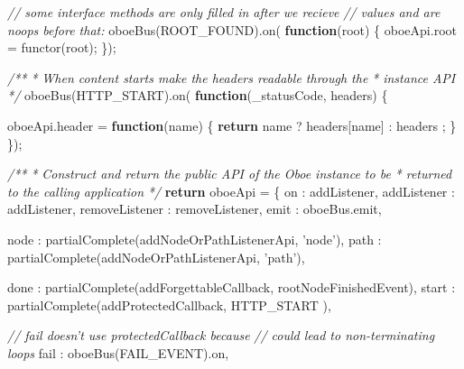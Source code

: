 \documentclass[12pt, ]{article}
\newenvironment{Shaded}{}{}
\newcommand{\KeywordTok}[1]{\textcolor[rgb]{0.00,0.44,0.13}{\textbf{{#1}}}}
\newcommand{\DataTypeTok}[1]{\textcolor[rgb]{0.56,0.13,0.00}{{#1}}}
\newcommand{\StringTok}[1]{\textcolor[rgb]{0.25,0.44,0.63}{{#1}}}
\newcommand{\CommentTok}[1]{\textcolor[rgb]{0.38,0.63,0.69}{\textit{{#1}}}}
\newcommand{\OtherTok}[1]{\textcolor[rgb]{0.00,0.44,0.13}{{#1}}}
\newcommand{\FunctionTok}[1]{\textcolor[rgb]{0.02,0.16,0.49}{{#1}}}
\newcommand{\NormalTok}[1]{{#1}}
\begin{document}
\begin{Shaded}
\begin{Highlighting}[]
   
   \CommentTok{// some interface methods are only filled in after we recieve}
   \CommentTok{// values and are noops before that:          }
   \FunctionTok{oboeBus}\NormalTok{(ROOT_FOUND).}\FunctionTok{on}\NormalTok{( }\KeywordTok{function}\NormalTok{(root) \{}
      \OtherTok{oboeApi}\NormalTok{.}\FunctionTok{root} \NormalTok{= }\FunctionTok{functor}\NormalTok{(root);   }
   \NormalTok{\});}

   \CommentTok{/**}
\CommentTok{    * When content starts make the headers readable through the}
\CommentTok{    * instance API}
\CommentTok{    */}
   \FunctionTok{oboeBus}\NormalTok{(HTTP_START).}\FunctionTok{on}\NormalTok{( }\KeywordTok{function}\NormalTok{(_statusCode, headers) \{}
   
      \OtherTok{oboeApi}\NormalTok{.}\FunctionTok{header} \NormalTok{=  }\KeywordTok{function}\NormalTok{(name) \{}
                           \KeywordTok{return} \NormalTok{name ? headers[name] }
                                       \NormalTok{: headers}
                                       \NormalTok{;}
                        \NormalTok{\}}
   \NormalTok{\});}
                                                               
   \CommentTok{/**}
\CommentTok{    * Construct and return the public API of the Oboe instance to be }
\CommentTok{    * returned to the calling application}
\CommentTok{    */}       
   \KeywordTok{return} \NormalTok{oboeApi = \{}
      \DataTypeTok{on             }\NormalTok{: addListener,}
      \DataTypeTok{addListener    }\NormalTok{: addListener, }
      \DataTypeTok{removeListener }\NormalTok{: removeListener,}
      \DataTypeTok{emit           }\NormalTok{: }\OtherTok{oboeBus}\NormalTok{.}\FunctionTok{emit}\NormalTok{,                }
                
      \DataTypeTok{node           }\NormalTok{: }\FunctionTok{partialComplete}\NormalTok{(addNodeOrPathListenerApi, }\StringTok{'node'}\NormalTok{),}
      \DataTypeTok{path           }\NormalTok{: }\FunctionTok{partialComplete}\NormalTok{(addNodeOrPathListenerApi, }\StringTok{'path'}\NormalTok{),}
      
      \DataTypeTok{done           }\NormalTok{: }\FunctionTok{partialComplete}\NormalTok{(addForgettableCallback, rootNodeFinishedEvent),            }
      \DataTypeTok{start          }\NormalTok{: }\FunctionTok{partialComplete}\NormalTok{(addProtectedCallback, HTTP_START ),}
      
      \CommentTok{// fail doesn't use protectedCallback because }
      \CommentTok{// could lead to non-terminating loops}
      \DataTypeTok{fail           }\NormalTok{: }\FunctionTok{oboeBus}\NormalTok{(FAIL_EVENT).}\FunctionTok{on}\NormalTok{,}
      

\end{Highlighting}
\end{Shaded}
\end{document}
